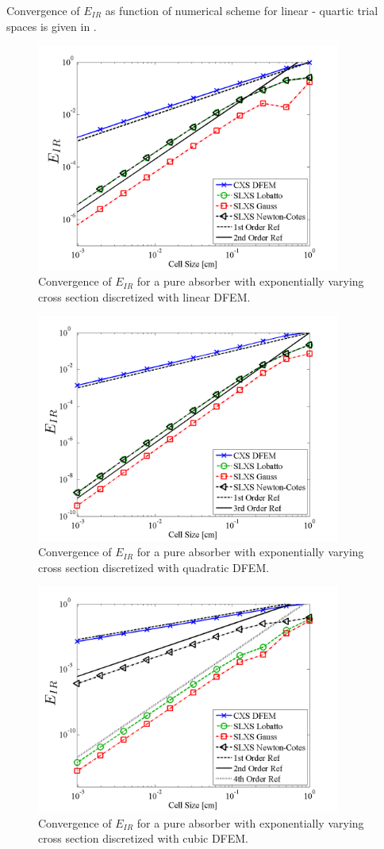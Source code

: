 Convergence of $E_{IR}$ as function of numerical scheme for linear - quartic trial spaces is given in .
%
%
\begin{figure}[!hbp]
\centering
\includegraphics[width=10cm]{chapter3_variable_xs/P1_VarXS_E_I_L2.png}
\caption{Convergence of $E_{IR}$ for a pure absorber with exponentially varying cross section discretized with linear DFEM.}
\label{fig:varxs_I_L2_p1}
\end{figure}
%
%
\begin{figure}[!htp]
\centering
\includegraphics[width=10cm]{chapter3_variable_xs/P2_VarXS_E_I_L2.png}
\caption{Convergence of $E_{IR}$ for a pure absorber with exponentially varying cross section discretized with quadratic DFEM.}
\label{fig:varxs_I_L2_p2}
\end{figure}
%
%
\begin{figure}[!hbp]
\centering
\includegraphics[width=10cm]{chapter3_variable_xs/P3_VarXS_E_I_L2.png}
\caption{Convergence of $E_{IR}$  for a pure absorber with exponentially varying cross section discretized with cubic DFEM.}
\label{fig:varxs_I_L2_p3}
\end{figure}
